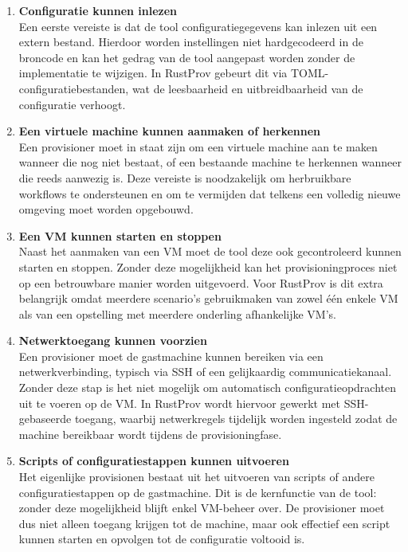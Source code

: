 \begin{enumerate}
    \item \textbf{Configuratie kunnen inlezen}\\
    Een eerste vereiste is dat de tool configuratiegegevens kan inlezen uit een extern bestand. Hierdoor worden instellingen niet hardgecodeerd in de broncode en kan het gedrag van de tool aangepast worden zonder de implementatie te wijzigen. In RustProv gebeurt dit via TOML-configuratiebestanden, wat de leesbaarheid en uitbreidbaarheid van de configuratie verhoogt.
    
    \item \textbf{Een virtuele machine kunnen aanmaken of herkennen}\\
    Een provisioner moet in staat zijn om een virtuele machine aan te maken wanneer die nog niet bestaat, of een bestaande machine te herkennen wanneer die reeds aanwezig is. Deze vereiste is noodzakelijk om herbruikbare workflows te ondersteunen en om te vermijden dat telkens een volledig nieuwe omgeving moet worden opgebouwd.
    
    \item \textbf{Een VM kunnen starten en stoppen}\\
    Naast het aanmaken van een VM moet de tool deze ook gecontroleerd kunnen starten en stoppen. Zonder deze mogelijkheid kan het provisioningproces niet op een betrouwbare manier worden uitgevoerd. Voor RustProv is dit extra belangrijk omdat meerdere scenario’s gebruikmaken van zowel één enkele VM als van een opstelling met meerdere onderling afhankelijke VM’s.
    
    \item \textbf{Netwerktoegang kunnen voorzien}\\
    Een provisioner moet de gastmachine kunnen bereiken via een netwerkverbinding, typisch via SSH of een gelijkaardig communicatiekanaal. Zonder deze stap is het niet mogelijk om automatisch configuratieopdrachten uit te voeren op de VM. In RustProv wordt hiervoor gewerkt met SSH-gebaseerde toegang, waarbij netwerkregels tijdelijk worden ingesteld zodat de machine bereikbaar wordt tijdens de provisioningfase.
    
    \item \textbf{Scripts of configuratiestappen kunnen uitvoeren}\\
    Het eigenlijke provisionen bestaat uit het uitvoeren van scripts of andere configuratiestappen op de gastmachine. Dit is de kernfunctie van de tool: zonder deze mogelijkheid blijft enkel VM-beheer over. De provisioner moet dus niet alleen toegang krijgen tot de machine, maar ook effectief een script kunnen starten en opvolgen tot de configuratie voltooid is.
    

\end{enumerate}

